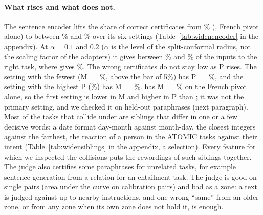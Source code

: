 \paragraph{What rises and what does not.} The sentence encoder lifts the share of correct certificates
from \WidenRefTfiveFrP{}\% (\cert{}, French pivot alone) to between \WidenEncRulerTwentyFrP{}\% and
\WidenEncPlainTenFrP{}\% over its six settings (Table~\ref{tab:widenencoder} in the appendix). At $\alpha = 0.1$ and
$0.2$ ($\alpha$ is the level of the split-conformal radius, not the scaling factor of the adapters) it gives between \WidenEncRHighLow{}\% and \WidenEncRHighHigh{}\% of the inputs to the right task, where \cert{}
gives \WidenRefTfiveFrR{}\%. The wrong certificates do not stay low as \textsf{P} rises. The setting with the fewest
(\textsf{M}~=~\WidenEncRulerTwentyFrM{}\%, above the bar of 5\%) has \textsf{P}~=~\WidenEncRulerTwentyFrP{}\%, and the setting with the
highest \textsf{P} (\WidenEncPlainTenFrP{}\%) has \textsf{M}~=~\WidenEncPlainTenFrM{}\%. \cert{} has \textsf{M}~=~\WidenRefTfiveFrM{}\%
on the French pivot alone, so the first setting is lower in \textsf{M} and higher in \textsf{P} than \cert{}; it was
not the primary setting, and we checked it on held-out paraphrases (next paragraph). Most of the tasks that collide under \cert{} are siblings
that differ in one or a few decisive words: a date format day-month against month-day, the closest integers against
the farthest, the reaction of a person in the ATOMIC tasks against their intent
(Table~\ref{tab:widensiblings} in the appendix, a selection). Every feature for which we inspected the collisions puts the
rewordings of such siblings together. The judge also certifies some paraphrases for unrelated tasks, for example
sentence generation from a relation for an entailment task. The judge is good on single pairs (area under the curve
\WidenJudgeAucNli{} on calibration pairs) and bad as a zone: a text is judged against up to \WidenJudgeLimit{} nearby
instructions, and one wrong ``same'' from an older zone, or from any zone when its own zone does not hold it, is enough.

